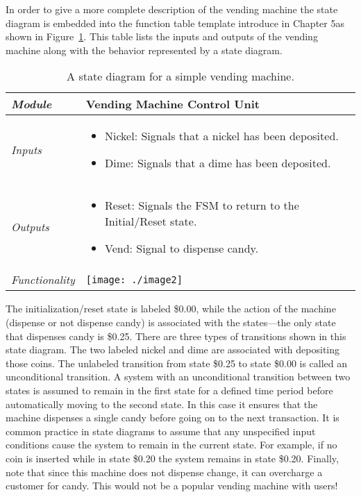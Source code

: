 In order to give a more complete description of the vending machine the
state diagram is embedded into the function table template introduce in
Chapter 5as shown in Figure~\ref{table:stateVendingMachine}.
 This table lists the inputs and outputs
of the vending machine along with the behavior represented by a state
diagram.

\begin{table}
\caption{A state diagram for a simple vending machine.}
\label{table:stateVendingMachine}
\begin{tabular}{|l|m{10cm}|}
\hline
\emph{Module} &Vending Machine Control Unit \\ \hline
\emph{Inputs} & 
\begin{itemize}
\item
  Nickel: Signals that a nickel has been deposited.
\item
  Dime: Signals that a dime has been deposited.
\end{itemize} \\ \hline

\emph{Outputs} & 
\begin{itemize}
\item
  Reset: Signals the FSM to return to the Initial/Reset state.
\item
  Vend: Signal to dispense candy.
\end{itemize} \\ \hline
\emph{Functionality} &
\texttt{[image: ./image2]} \\ \hline
\end{tabular}
\end{table}


The initialization/reset state is labeled \$0.00, while the action of
the machine (dispense or not dispense candy) is associated with the
states---the only state that dispenses candy is \$0.25. There are three
types of transitions shown in this state diagram. The two labeled nickel
and dime are associated with depositing those coins. The unlabeled
transition from state \$0.25 to state \$0.00 is called an unconditional
transition. A system with an unconditional transition between two states
is assumed to remain in the first state for a defined time period before
automatically moving to the second state. In this case it ensures that
the machine dispenses a single candy before going on to the next
transaction. It is common practice in state diagrams to assume that any
unspecified input conditions cause the system to remain in the current
state. For example, if no coin is inserted while in state \$0.20 the
system remains in state \$0.20. Finally, note that since this machine
does not dispense change, it can overcharge a customer for candy. This
would not be a popular vending machine with users!


